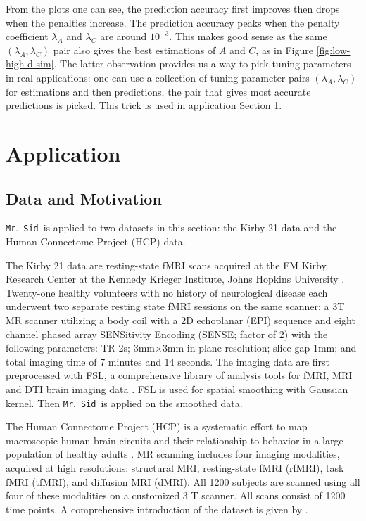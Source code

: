 \documentclass[fleqn,12pt]{article}
\let\oldref\ref
\renewcommand{\ref}[1]{(\oldref{#1})}
\newcommand{\mrsid}{{\sc \texttt{Mr}.~\texttt{Sid}}}
\begin{document}
From the plots one can see, the prediction accuracy first improves then drops when the penalties increase. The prediction accuracy peaks when the penalty coefficient $\lambda_A$ and $\lambda_C$ are around $10^{-3}$. This makes good sense as the same $(\lambda_A,\lambda_C)$ pair also gives the best estimations of $A$ and $C$, as in Figure \oldref{fig:low-high-d-sim}. The latter observation provides us a way to pick tuning parameters in real applications: one can use a collection of tuning parameter pairs $(\lambda_A,\lambda_C)$ for estimations and then predictions, the pair that gives most accurate predictions is picked. This trick is used in application Section \oldref{sec:application}.

\section{Application}
\label{sec:application}

\subsection{Data and Motivation}

\mrsid~is applied to two datasets in this section: the Kirby 21 data and the Human Connectome Project (HCP) data.

The Kirby 21 data are resting-state fMRI scans acquired at the FM Kirby Research Center at the Kennedy Krieger Institute, Johns Hopkins University \citep{landman2011multi}. Twenty-one healthy volunteers with no history of neurological disease each underwent two separate resting state fMRI sessions on the same scanner: a 3T MR scanner utilizing a body coil with a 2D echoplanar (EPI) sequence and eight channel phased array SENSitivity Encoding (SENSE; factor of 2) with the following parameters: TR 2s; 3mm$\times$3mm in plane resolution; slice gap 1mm; and total imaging time of 7 minutes and 14 seconds. The imaging data are first preprocessed with FSL, a comprehensive library of analysis tools for fMRI, MRI and DTI brain imaging data \citep{smith2004advances}. FSL is used for spatial smoothing with Gaussian kernel. Then \mrsid~is applied on the smoothed data.

The Human Connectome Project (HCP) is a systematic effort to map macroscopic human brain circuits and their relationship to behavior in a large population of healthy adults \citep{van2013wu,moeller2010multiband,feinberg2010multiplexed}. MR scanning includes four imaging modalities, acquired at high resolutions: structural MRI, resting-state fMRI (rfMRI), task fMRI (tfMRI), and diffusion MRI (dMRI). All 1200 subjects are scanned using all four of these modalities on a customized 3 T scanner.  All scans consist of 1200 time points. A comprehensive introduction of the dataset is given by \cite{van2013wu}.
\end{document}
